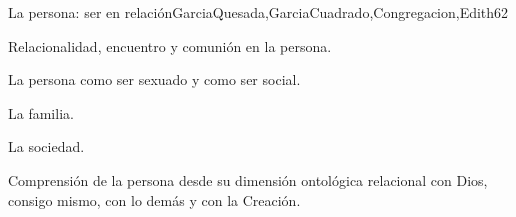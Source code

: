 \begin{syllabus}
\begin{unit}{La persona: ser en relación}{GarciaQuesada,GarciaCuadrado,Congregacion,Edith}{6}{2}
\begin{topics}
 	 	 		\item Relacionalidad, encuentro y comunión en la persona.
 	 	 		\item La persona como ser sexuado y como ser social.
 	 	 		\item La familia.
 	 	 		\item La sociedad.
\end{topics}

\begin{unitgoals}
	\item Comprensión de la persona desde su dimensión ontológica relacional con Dios, consigo mismo, con lo demás y con la Creación.
\end{unitgoals}
\end{unit}



\begin{coursebibliography}
\end{coursebibliography}

\end{syllabus}

